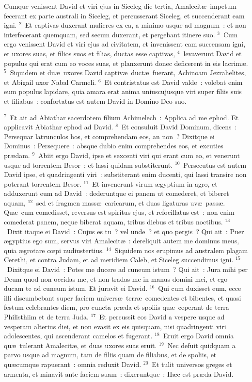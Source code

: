 \lettrine[lines=10,image=true,loversize=0.05,lraise=-0.03]{C}{}umque venissent David et viri ejus in Siceleg die tertia, Amalecit\ae\ impetum fecerant ex parte australi in Siceleg, et percusserant Siceleg, et succenderant eam igni.
${}^{2}$~Et captivas duxerant mulieres ex ea, a minimo usque ad magnum~: et non interfecerant quemquam, sed secum duxerant, et pergebant itinere suo.
${}^{3}$~Cum ergo venissent David et viri ejus ad civitatem, et invenissent eam succensam igni, et uxores suas, et filios suos et filias, ductas esse captivas,
${}^{4}$~levaverunt David et populus qui erat cum eo voces suas, et planxerunt donec deficerent in eis lacrim\ae .
${}^{5}$~Siquidem et du\ae\ uxores David captiv\ae\ duct\ae\ fuerant, Achinoam Jezrahelites, et Abigail uxor Nabal Carmeli.
${}^{6}$~Et contristatus est David valde~: volebat enim eum populus lapidare, quia amara erat anima uniuscujusque viri super filiis suis et filiabus~: confortatus est autem David in Domino Deo suo.


${}^{7}$~Et ait ad Abiathar sacerdotem filium Achimelech~: Applica ad me ephod. Et applicavit Abiathar ephod ad David.
${}^{8}$~Et consuluit David Dominum, dicens~: Persequar latrunculos hos, et comprehendam eos, an non~? Dixitque ei Dominus~: Persequere~: absque dubio enim comprehendes eos, et excuties pr\ae dam.
${}^{9}$~Abiit ergo David, ipse et sexcenti viri qui erant cum eo, et venerunt usque ad torrentem Besor~: et lassi quidam substiterunt.
${}^{10}$~Persecutus est autem David ipse, et quadringenti viri~: substiterant enim ducenti, qui lassi transire non poterant torrentem Besor.
${}^{11}$~Et invenerunt virum \ae gyptium in agro, et adduxerunt eum ad David~: dederuntque ei panem ut comederet, et biberet aquam,
${}^{12}$~sed et fragmen mass\ae\ caricarum, et duas ligaturas uv\ae\ pass\ae . Qu\ae\ cum comedisset, reversus est spiritus ejus, et refocillatus est~: non enim comederat panem, neque biberat aquam, tribus diebus et tribus noctibus.
${}^{13}$~Dixit itaque ei David~: Cujus es tu~? vel unde~? et quo pergis~? Qui ait~: Puer \ae gyptius ego sum, servus viri Amalecit\ae~: dereliquit autem me dominus meus, quia \ae grotare cœpi nudiustertius.
${}^{14}$~Siquidem nos erupimus ad australem plagam Cerethi, et contra Judam, et ad meridiem Caleb, et Siceleg succendimus igni.
${}^{15}$~Dixitque ei David~: Potes me ducere ad cuneum istum~? Qui ait~: Jura mihi per Deum quod non occidas me, et non tradas me in manus domini mei, et ego ducam te ad cuneum istum. Et juravit ei David.
${}^{16}$~Qui cum duxisset eum, ecce illi discumbebant super faciem univers\ae\ terr\ae\ comedentes et bibentes, et quasi festum celebrantes diem, pro cuncta pr\ae da et spoliis qu\ae\ ceperant de terra Philisthiim et de terra Juda.
${}^{17}$~Et percussit eos David a vespere usque ad vesperam alterius diei, et non evasit ex eis quisquam, nisi quadringenti viri adolescentes, qui ascenderant camelos et fugerant.
${}^{18}$~Eruit ergo David omnia qu\ae\ tulerant Amalecit\ae , et duas uxores suas eruit.
${}^{19}$~Nec defuit quidquam a parvo usque ad magnum, tam de filiis quam de filiabus, et de spoliis, et qu\ae cumque rapuerant~: omnia reduxit David.
${}^{20}$~Et tulit universos greges et armenta, et minavit ante faciem suam~: dixeruntque~: H\ae c est pr\ae da David.


